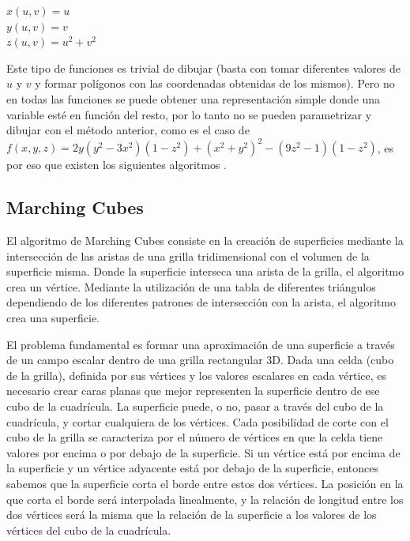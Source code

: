 \documentclass[12pt]{article}
\begin{document}
\begin{center}
$x(u,v) = u$\\
$y(u,v) = v$\\
$z(u,v) = u^2+v^2$\\
\end{center}

Este tipo de funciones es trivial de dibujar (basta con tomar diferentes valores de $u$ y $v$ y formar polígonos con las coordenadas obtenidas de los mismos).
Pero no en todas las funciones se puede obtener una representación simple donde una variable esté en función del resto, por lo tanto no se pueden parametrizar y dibujar con el método anterior, como es el caso de  $f(x,y,z) = 2y(y^2-3x^2)(1-z^2)+(x^2+y^2)^2-(9z^2-1)(1-z^2)$, es por eso que existen los siguientes algoritmos \cite{implicitas}.

\subsection{Marching Cubes}
El algoritmo de Marching Cubes\cite{marching}\cite{marchingcubes} consiste en la creación de superficies mediante la intersección de las aristas de una grilla tridimensional con el volumen de la superficie misma. Donde la superficie interseca una arista de la grilla, el algoritmo crea un vértice. Mediante la utilización de una tabla de diferentes triángulos dependiendo de los diferentes patrones de intersección con la arista, el algoritmo crea una superficie.

El problema fundamental es formar una aproximación de una superficie a través de un campo escalar dentro de una grilla rectangular 3D. Dada una celda (cubo de la grilla), definida por sus vértices y los valores escalares en cada vértice, es necesario crear caras planas que mejor representen la superficie dentro de ese cubo de la cuadrícula. La superficie puede, o no, pasar a través del cubo de la cuadrícula, y cortar cualquiera de los vértices. Cada posibilidad de corte con el cubo de la grilla se caracteriza por el número de vértices en que la celda tiene valores por encima o por debajo de la superficie. Si un vértice está por encima de la superficie y un vértice adyacente está por debajo de la superficie, entonces sabemos que la superficie corta el borde entre estos dos vértices. La posición en la que corta el borde será interpolada linealmente, y la relación de longitud entre los dos vértices será la misma que la relación de la superficie a los valores de los vértices del cubo de la cuadrícula.
\end{document}

